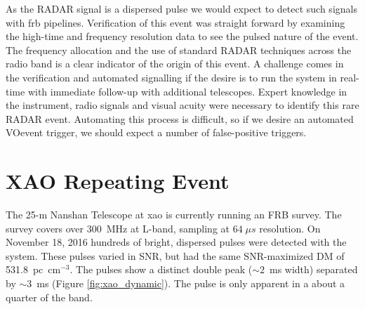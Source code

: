 \documentclass[a4paper,fleqn,usenatbib]{mnras}
\begin{document}
As the RADAR signal is a dispersed pulse we would expect to detect such signals
with \gls{frb} pipelines.  Verification of this event was straight forward by
examining the high-time and frequency resolution data to see the pulsed nature
of the event.  The frequency allocation and the use of standard RADAR techniques
across the radio band is a clear indicator of the origin of this event.  A
challenge comes in the verification and automated signalling if the desire is to
run the system in real-time with immediate follow-up with additional telescopes.
Expert knowledge in the instrument, radio signals and visual acuity were
necessary to identify this rare RADAR event.  Automating this process is
difficult, so if we desire an automated VOevent trigger, we should expect a
number of false-positive triggers.

\section{XAO Repeating Event}
\label{sec:xao_event}

The 25-m Nanshan Telescope at \gls{xao} is currently running an FRB survey. The
survey covers over 300~MHz at L-band, sampling at $64 \; \mu s$ resolution. On
November 18, 2016 hundreds of bright, dispersed pulses were detected with the
system. These pulses varied in SNR, but had the same SNR-maximized DM of
531.8~pc~cm$^{-3}$. The pulses show a distinct double peak ($\sim 2$~ms width)
separated by $\sim 3$~ms (Figure \ref{fig:xao_dynamic}). The pulse is only
apparent in a about a quarter of the band.
\end{document}
